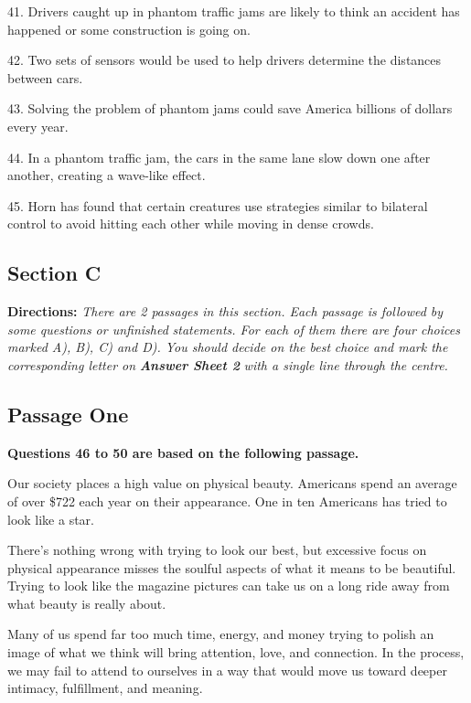 \documentclass[UTF8,11pt]{ctexart}
\begin{document}
41. Drivers caught up in phantom traffic jams are likely to think an accident has happened or some construction is going on.


42. Two sets of sensors would be used to help drivers determine the distances between cars.


43. Solving the problem of phantom jams could save America billions of dollars every year.


44. In a phantom traffic jam, the cars in the same lane slow down one after another, creating a wave-like effect.


45. Horn has found that certain creatures use strategies similar to bilateral control to avoid hitting each other while moving in dense crowds.


\subsection*{\textbf{Section C}}


\textbf{Directions: }\textit{There are 2 passages in this section. Each passage is followed by some questions or unfinished} \textit{statements. For each of them there are four choices marked A), B), C) and D). You should decide on the best} \textit{choice and mark the corresponding letter on }\textbf{\textit{Answer Sheet 2}}\textit{ with a single line through the centre.}


\subsection*{\textbf{Passage One}}


\textbf{Questions 46 to 50 are based on the following passage.}


Our society places a high value on physical beauty. Americans spend an average of over \$722 each year on their appearance. One in ten Americans has tried to look like a star.


There’s nothing wrong with trying to look our best, but excessive focus on physical appearance misses the soulful aspects of what it means to be beautiful. Trying to look like the magazine pictures can take us on a long ride away from what beauty is really about.


Many of us spend far too much time, energy, and money trying to polish an image of what we think will bring attention, love, and connection. In the process, we may fail to attend to ourselves in a way that would move us toward deeper intimacy, fulfillment, and meaning.
\end{document}
